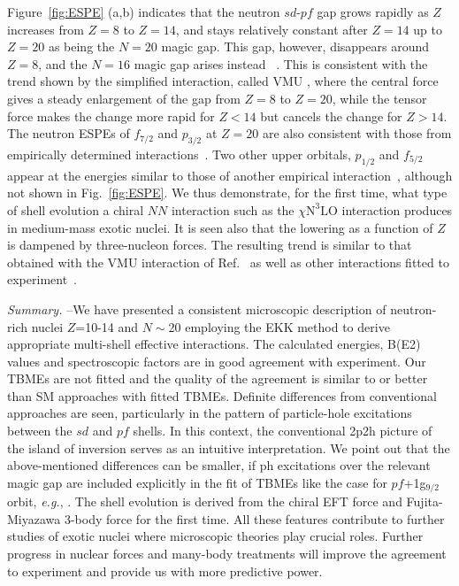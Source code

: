 \documentclass[aps,prl,twocolumn,groupedaddress,showkeys,showpacs,floatfix,superscriptaddress]{revtex4-1}
\newcommand\+{^\dagger}
\newcommand\ntlo{\chi\mathrm{N}^3\mathrm{LO} }
\begin{document}
Figure~\ref{fig:ESPE} (a,b) indicates that the neutron $sd$-$pf$ gap grows 
rapidly as $Z$ increases
from $Z=8$ to $Z=14$, and stays relatively constant after $Z=14$ up to $Z=20$ 
as being the $N=20$ magic gap.
This gap, however, disappears around $Z=8$, and the $N=16$ magic gap arises instead
~\cite{brownN16,ozawaPRL84,magic}.  
This is consistent with the trend shown by the simplified interaction, called VMU \cite{Otsuka:2009qs}, 
where the central force gives a steady enlargement of the gap from $Z=8$ to $Z=20$, 
while the tensor force makes the change more rapid for $Z < 14$ but cancels the change for  
$Z >14$.
The neutron ESPEs of $f_{7/2}$ and $p_{3/2}$ at $Z=20$ are also consistent
with those from empirically determined interactions~\cite{PhysRevC.60.054315}.
Two other upper orbitals, $p_{1/2}$ and $f_{5/2}$
appear at the energies similar to those of another empirical
interaction~\cite{PhysRevC.65.061301},
although not shown in Fig.~\ref{fig:ESPE}.
We thus demonstrate, for the first time, what type of shell evolution a chiral $NN$ interaction 
such as the $\ntlo$ interaction produces in medium-mass exotic nuclei.   
It is seen also that the lowering as a function of $Z$ is dampened  by three-nucleon forces.
The resulting trend is similar to that obtained  with the VMU
interaction of Ref.~\cite{Otsuka:2009qs} as well as other interactions
fitted to experiment~\cite{PhysRevC.60.054315,Caurier:2013aoa,RevModPhys.77.427}.


{\it Summary.} --We have presented a consistent microscopic description
of neutron-rich nuclei
$Z$=10-14 and $N\sim$20 employing  the EKK method to derive appropriate multi-shell effective interactions.
The calculated energies, B(E2) values and spectroscopic factors are 
in good agreement with experiment.  Our TBMEs are not fitted and
the quality of the agreement is similar to or better than SM approaches with fitted TBMEs.
Definite differences from conventional approaches are seen, particularly in the 
pattern of particle-hole excitations between the $sd$ and $pf$ shells.  
In this context, the conventional 2p2h picture of the island of inversion 
serves as an intuitive interpretation.
We point out that the above-mentioned differences can be smaller,  
if ph excitations over the relevant magic gap are included explicitly in the fit of TBMEs 
like the case for $pf$+1g$_{9/2}$ orbit, {\it e.g.}, \cite{jun45,68ni}. 
The shell evolution is derived from the chiral EFT force and 
Fujita-Miyazawa 3-body force for the first time.
All these features contribute to further studies of exotic nuclei where microscopic theories 
play crucial roles.  
Further progress in nuclear forces and many-body treatments will improve
the agreement to experiment and provide us with more predictive power.
\end{document}
